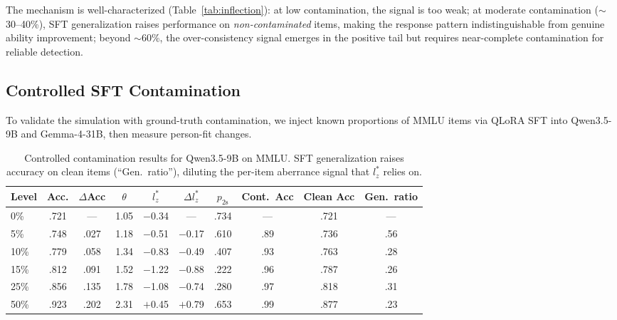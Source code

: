 \documentclass[11pt,a4paper]{article}
\newcommand{\lzstar}{$l_{z}^{*}$}
\begin{document}
The mechanism is well-characterized (Table~\ref{tab:inflection}): at low contamination, the signal is too weak; at moderate contamination ($\sim$30--40\%), SFT generalization raises performance on \emph{non-contaminated} items, making the response pattern indistinguishable from genuine ability improvement; beyond $\sim$60\%, the over-consistency signal emerges in the positive tail but requires near-complete contamination for reliable detection.

\subsection{Controlled SFT Contamination}
\label{sec:controlled}

To validate the simulation with ground-truth contamination, we inject known proportions of MMLU items via QLoRA SFT into Qwen3.5-9B and Gemma-4-31B, then measure person-fit changes.

\begin{table}[t]
\centering
\caption{Controlled contamination results for Qwen3.5-9B on MMLU. SFT generalization raises accuracy on clean items (``Gen.\ ratio''), diluting the per-item aberrance signal that \lzstar{} relies on.}
\label{tab:ctrl_qwen}
\small
\begin{tabular}{@{}lccccccccc@{}}
\toprule
Level & Acc. & $\Delta$Acc & $\theta$ & $l_z^*$ & $\Delta l_z^*$ & $p_\text{2s}$ & Cont.\ Acc & Clean Acc & Gen.\ ratio \\
\midrule
0\% & .721 & --- & 1.05 & $-$0.34 & --- & .734 & --- & .721 & --- \\
5\% & .748 & .027 & 1.18 & $-$0.51 & $-$0.17 & .610 & .89 & .736 & .56 \\
10\% & .779 & .058 & 1.34 & $-$0.83 & $-$0.49 & .407 & .93 & .763 & .28 \\
15\% & .812 & .091 & 1.52 & $-$1.22 & $-$0.88 & .222 & .96 & .787 & .26 \\
25\% & .856 & .135 & 1.78 & $-$1.08 & $-$0.74 & .280 & .97 & .818 & .31 \\
50\% & .923 & .202 & 2.31 & $+$0.45 & $+$0.79 & .653 & .99 & .877 & .23 \\
\bottomrule
\end{tabular}
\end{table}
\end{document}
